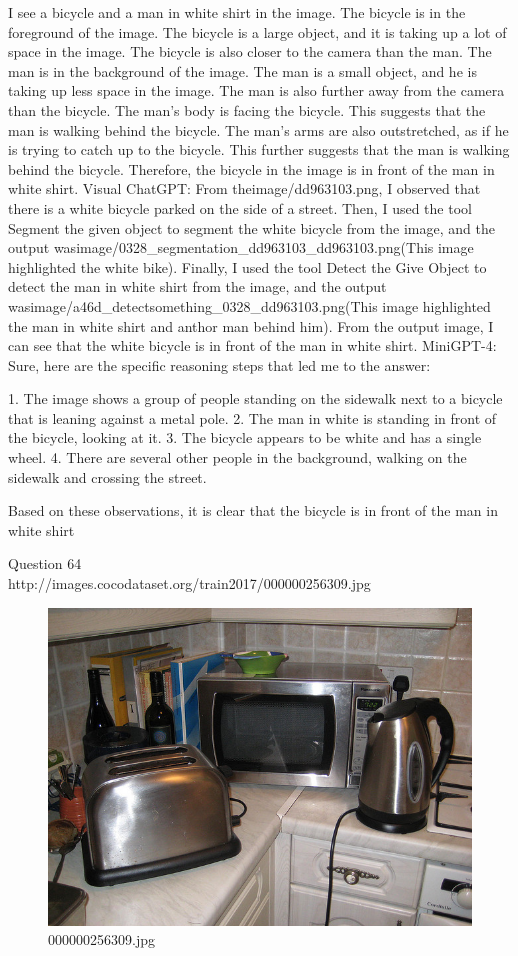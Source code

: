 \begin{enumerate}
    I see a bicycle and a man in white shirt in the image.
    The bicycle is in the foreground of the image. The bicycle is a large object, and it is taking up a lot of space in the image. The bicycle is also closer to the camera than the man.
    The man is in the background of the image. The man is a small object, and he is taking up less space in the image. The man is also further away from the camera than the bicycle.
    The man's body is facing the bicycle. This suggests that the man is walking behind the bicycle.
    The man's arms are also outstretched, as if he is trying to catch up to the bicycle. This further suggests that the man is walking behind the bicycle.
    Therefore, the bicycle in the image is in front of the man in white shirt.
    \subitem Visual ChatGPT: From theimage/dd963103.png, I observed that there is a white bicycle parked on the side of a street. Then, I used the tool Segment the given object to segment the white bicycle from the image, and the output wasimage/0328\_segmentation\_dd963103\_dd963103.png(This image highlighted the white bike). Finally, I used the tool Detect the Give Object to detect the man in white shirt from the image, and the output wasimage/a46d\_detect\-something\_0328\_dd963103.png(This image highlighted the man in white shirt and anthor man behind him). From the output image, I can see that the white bicycle is in front of the man in white shirt.
    \subitem MiniGPT-4: Sure, here are the specific reasoning steps that led me to the answer:

    1. The image shows a group of people standing on the sidewalk next to a bicycle that is leaning against a metal pole.
    2. The man in white is standing in front of the bicycle, looking at it.
    3. The bicycle appears to be white and has a single wheel.
    4. There are several other people in the background, walking on the sidewalk and crossing the street.
    
    Based on these observations, it is clear that the bicycle is in front of the man in white shirt
\end{enumerate}
Question 64\\
http://images.cocodataset.org/train2017/000000256309.jpg
\begin{figure}[h]
    \centering
    \includegraphics[width=0.8\linewidth]{../image set/hard/000000256309.jpg}
    \caption{000000256309.jpg}
\end{figure}
